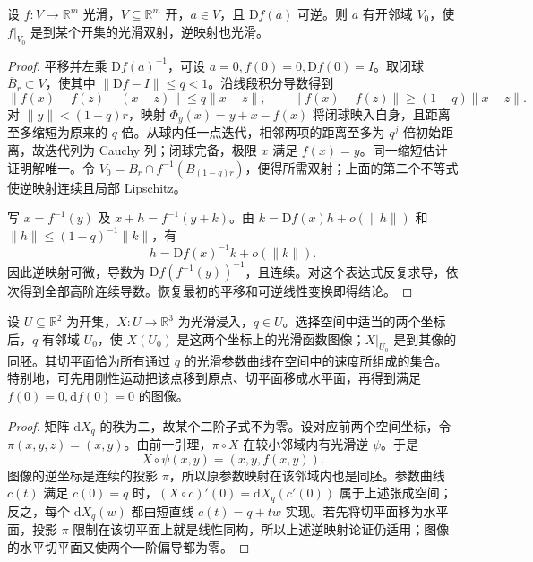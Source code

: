 \begin{lemma}\label{g1:lem:surface-local-inverse}
	设 \(f:V\rightarrow\mathbb R^m\) 光滑，\(V\subseteq\mathbb R^m\) 开，\(a\in V\)，且 \(\mathrm{D}f(a)\) 可逆。则 \(a\) 有开邻域 \(V_0\)，使 \(f|_{V_0}\) 是到某个开集的光滑双射，逆映射也光滑。
\end{lemma}

\begin{proof}
	平移并左乘 \(\mathrm{D}f(a)^{-1}\)，可设 \(a=0,f(0)=0,\mathrm{D}f(0)=I\)。取闭球 \(\overline B_r\subset V\)，使其中 \(\|\mathrm{D}f-I\|\le q<1\)。沿线段积分导数得到
	\[
		\|f(x)-f(z)-(x-z)\|\le q\|x-z\|,\qquad
		\|f(x)-f(z)\|\ge(1-q)\|x-z\|.
	\]
	对 \(\|y\|<(1-q)r\)，映射 \(\Phi_y(x)=y+x-f(x)\) 将闭球映入自身，且距离至多缩短为原来的 \(q\) 倍。从球内任一点迭代，相邻两项的距离至多为 \(q^j\) 倍初始距离，故迭代列为 Cauchy 列；闭球完备，极限 \(x\) 满足 \(f(x)=y\)。同一缩短估计证明解唯一。令 \(V_0=B_r\cap f^{-1}(B_{(1-q)r})\)，便得所需双射；上面的第二个不等式使逆映射连续且局部 Lipschitz。

	写 \(x=f^{-1}(y)\) 及 \(x+h=f^{-1}(y+k)\)。由 \(k=\mathrm{D}f(x)h+o(\|h\|)\) 和 \(\|h\|\le(1-q)^{-1}\|k\|\)，有
	\[
		h=\mathrm{D}f(x)^{-1}k+o(\|k\|).
	\]
	因此逆映射可微，导数为 \(\mathrm{D}f(f^{-1}(y))^{-1}\)，且连续。对这个表达式反复求导，依次得到全部高阶连续导数。恢复最初的平移和可逆线性变换即得结论。
\end{proof}

\begin{proposition}\label{g1:prop:surface-local-graph}
	设 \(U\subseteq\mathbb R^2\) 为开集，\(X:U\rightarrow\mathbb R^3\) 为光滑浸入，\(q\in U\)。选择空间中适当的两个坐标后，\(q\) 有邻域 \(U_0\)，使 \(X(U_0)\) 是这两个坐标上的光滑函数图像；\(X|_{U_0}\) 是到其像的同胚。其切平面恰为所有通过 \(q\) 的光滑参数曲线在空间中的速度所组成的集合。特别地，可先用刚性运动把该点移到原点、切平面移成水平面，再得到满足 \(f(0)=0,\mathrm{d}f(0)=0\) 的图像。
\end{proposition}

\begin{proof}
	矩阵 \(\mathrm{d}X_q\) 的秩为二，故某个二阶子式不为零。设对应前两个空间坐标，令 \(\pi(x,y,z)=(x,y)\)。由前一引理，\(\pi\circ X\) 在较小邻域内有光滑逆 \(\psi\)。于是
	\[
		X\circ\psi(x,y)=(x,y,f(x,y)).
	\]
	图像的逆坐标是连续的投影 \(\pi\)，所以原参数映射在该邻域内也是同胚。参数曲线 \(c(t)\) 满足 \(c(0)=q\) 时，\((X\circ c)'(0)=\mathrm{d}X_q(c'(0))\) 属于上述张成空间；反之，每个 \(\mathrm{d}X_q(w)\) 都由短直线 \(c(t)=q+tw\) 实现。若先将切平面移为水平面，投影 \(\pi\) 限制在该切平面上就是线性同构，所以上述逆映射论证仍适用；图像的水平切平面又使两个一阶偏导都为零。
\end{proof}

